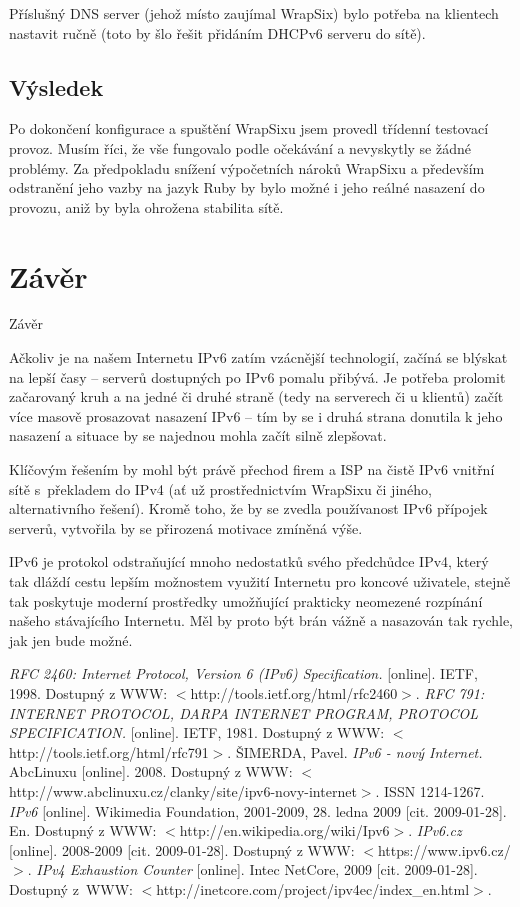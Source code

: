 \documentclass[12pt]{report}
\newcommand{\kapitola}[1]{
	\refstepcounter{chapter}
	\lhead{\thechapter. #1}
	\rhead{Michal Zima}
	\typeout{\chaptername\space\thechapter.}
	\chapter*{\protect\thechapter\hspace{0.75em} #1}
	\addcontentsline{toc}{chapter} {
		\protect\numberline{\thechapter}#1
	}
}
\begin{document}
Příslušný DNS server (jehož místo zaujímal WrapSix) bylo potřeba na klientech nastavit ručně (toto by šlo řešit přidáním DHCPv6 serveru do sítě).

\section{Výsledek}
Po dokončení konfigurace a spuštění WrapSixu jsem provedl třídenní testovací provoz. Musím říci, že vše fungovalo podle očekávání a nevyskytly se žádné problémy. Za předpokladu snížení výpočetních nároků WrapSixu a především odstranění jeho vazby na jazyk Ruby by bylo možné i jeho reálné nasazení do provozu, aniž by byla ohrožena stabilita sítě.
\newpage{}

\kapitola{Závěr}
Ačkoliv je na našem Internetu IPv6 zatím vzácnější technologií, začíná se blýskat na lepší časy -- serverů dostupných po IPv6 pomalu přibývá. Je potřeba prolomit začarovaný kruh a na jedné či druhé straně (tedy na serverech či u klientů) začít více masově prosazovat nasazení IPv6 -- tím by se i druhá strana donutila k jeho nasazení a situace by se najednou mohla začít silně zlepšovat.

Klíčovým řešením by mohl být právě přechod firem a ISP na čistě IPv6 vnitřní sítě s~překladem do IPv4 (ať už prostřednictvím WrapSixu či jiného, alternativního řešení). Kromě toho, že by se zvedla používanost IPv6 přípojek serverů, vytvořila by se přirozená motivace zmíněná výše.

IPv6 je protokol odstraňující mnoho nedostatků svého předchůdce IPv4, který tak dláždí cestu lepším možnostem využití Internetu pro koncové uživatele, stejně tak poskytuje moderní prostředky umožňující prakticky neomezené rozpínání našeho stávajícího Internetu. Měl by proto být brán vážně a nasazován tak rychle, jak jen bude možné.
\newpage{}

\begin{thebibliography}{1}
\bibitem{}
	{\em RFC 2460: Internet Protocol, Version 6 (IPv6) Specification.}
	{[online]. IETF, 1998. Dostupný z WWW: $<$http://tools.ietf.org/html/rfc2460$>$.}
\bibitem{}
	{\em RFC 791: INTERNET PROTOCOL, DARPA INTERNET PROGRAM, PROTOCOL SPECIFICATION.}
	{[online]. IETF, 1981. Dostupný z WWW: $<$http://tools.ietf.org/html/rfc791$>$.}
\bibitem{}
	{ŠIMERDA, Pavel.}
	{\em IPv6 - nový Internet.}
	{AbcLinuxu [online]. 2008. Dostupný z WWW: $<$http://www.abclinuxu.cz/clanky/site/ipv6-novy-internet$>$. ISSN 1214-1267.}
\bibitem{}
	{\em IPv6}
	{[online]. Wikimedia Foundation, 2001-2009, 28. ledna 2009 [cit. 2009-01-28]. En. Dostupný z WWW: $<$http://en.wikipedia.org/wiki/Ipv6$>$.}
\bibitem{}
	{\em IPv6.cz}
	{[online]. 2008-2009 [cit. 2009-01-28]. Dostupný z WWW: $<$https://www.ipv6.cz/$>$.}
\bibitem{}
	{\em IPv4 Exhaustion Counter}
	{[online]. Intec NetCore, 2009 [cit. 2009-01-28]. Dostupný z~WWW: $<$http://inetcore.com/project/ipv4ec/index\_en.html$>$.}
\end{thebibliography}
\end{document}
